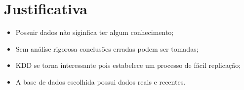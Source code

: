 \section{Justificativa}

\begin{frame}
	\begin{itemize}
		\item Possuir dados não siginfica ter algum conhecimento;
		\item Sem análise rigorosa conclusões erradas podem ser tomadas;
		\item KDD se torna interessante pois estabelece um processo de fácil replicação;
		\item A base de dados escolhida possui dados reais e recentes.
	\end{itemize}
\end{frame}
